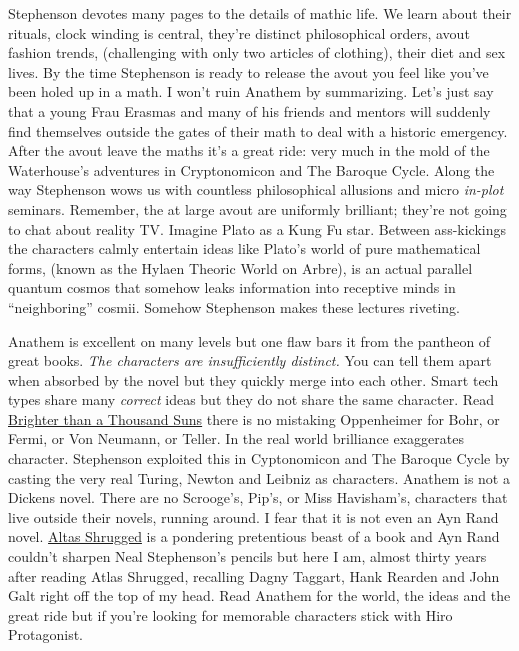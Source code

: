 Stephenson devotes many pages to the details of mathic life. We learn
about their rituals, clock winding is central, they're distinct
philosophical orders, avout fashion trends, (challenging with only two
articles of clothing), their diet and sex lives. By the time Stephenson
is ready to release the avout you feel like you've been holed up in a
math. I won't ruin Anathem by summarizing. Let's just say that a young
Frau Erasmas and many of his friends and mentors will suddenly find
themselves outside the gates of their math to deal with a historic
emergency. After the avout leave the maths it's a great ride: very much
in the mold of the Waterhouse's adventures in Cryptonomicon and The
Baroque Cycle. Along the way Stephenson wows us with countless
philosophical allusions and micro \emph{in-plot} seminars. Remember, the
at large avout are uniformly brilliant; they're not going to chat about
reality TV. Imagine Plato as a Kung Fu star. Between ass-kickings the
characters calmly entertain ideas like Plato's world of pure
mathematical forms, (known as the Hylaen Theoric World on Arbre), is an
actual parallel quantum cosmos that somehow leaks information into
receptive minds in ``neighboring'' cosmii. Somehow Stephenson makes
these lectures riveting.

Anathem is excellent on many levels but one flaw bars it from the
pantheon of great books. \emph{The characters are insufficiently
distinct.} You can tell them apart when absorbed by the novel but they
quickly merge into each other. Smart tech types share many
\emph{correct} ideas but they do not share the same character. Read
\href{http://www.amazon.com/Brighter-than-Thousand-Suns-Scientists/dp/0156141507}{Brighter
than a Thousand Suns} there is no mistaking Oppenheimer for Bohr, or
Fermi, or Von Neumann, or Teller. In the real world brilliance
exaggerates character. Stephenson exploited this in Cyptonomicon and The
Baroque Cycle by casting the very real Turing, Newton and Leibniz as
characters. Anathem is not a Dickens novel. There are no Scrooge's,
Pip's, or Miss Havisham's, characters that live outside their novels,
running around. I fear that it is not even an Ayn Rand novel.
\href{http://www.amazon.com/Atlas-Shrugged-Ayn-Rand/dp/0451191145}{Altas
Shrugged} is a pondering pretentious beast of a book and Ayn Rand
couldn't sharpen Neal Stephenson's pencils but here I am, almost thirty
years after reading Atlas Shrugged, recalling Dagny Taggart, Hank
Rearden and John Galt right off the top of my head. Read Anathem for the
world, the ideas and the great ride but if you're looking for memorable
characters stick with Hiro Protagonist.




%